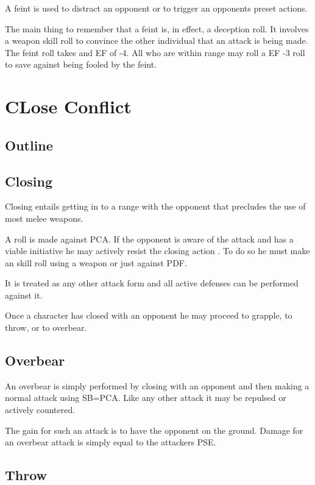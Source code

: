 A feint is used to distract an opponent or to trigger an opponents 
preset actions. 

The main thing to remember that a feint is, in effect, a deception 
roll. It involves a weapon skill roll to convince the other 
individual that an attack is being made. The feint roll takes and EF 
of -4. All who are within range may roll a EF -3 roll to save against 
being fooled by the feint.

\section{CLose Conflict}

\subsection{Outline}

\subsection{Closing}

Closing entails getting in to a range with the opponent that 
precludes the use of most melee weapons.

A roll is made against PCA. If the opponent is aware of the attack 
and has a viable initiative he may actively resist the closing action 
. To do so he must make an skill roll using a weapon or just against 
PDF.

It is treated as any other attack form and all active defenses can be 
performed against it.

Once a character has closed with an opponent he may proceed to 
grapple, to throw, or to overbear.

\subsection{Overbear}

An overbear is simply performed by closing with an opponent and then 
making a normal attack using SB=PCA. Like any other attack it may be 
repulsed or actively countered.

The gain for such an attack is to have the opponent on the ground.
Damage for an overbear attack is simply equal to the attackers PSE.

\subsection{Throw}

